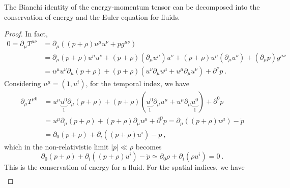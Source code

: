     The Bianchi identity of the energy-momentum tensor can be decomposed into the conservation of energy and the Euler equation for fluids.
    \begin{proof}
        In fact, 
        \begin{equation*}
        \begin{aligned}
            0 = \partial_\mu T^{\mu\nu} & = \partial_\mu ((p+\rho) u^\mu u^\nu + p g^{\mu\nu}) \\ & = \partial_\mu (p + \rho) u^\mu u^\nu + (p + \rho) (\partial_\mu u^\mu) u^\nu + (p + \rho) u^\mu (\partial_\mu u^\nu)  + (\partial_\mu p) g^{\mu\nu} \\ & = u^\mu u^\nu \partial_\mu (p + \rho) + (p + \rho) (u^\nu \partial_\mu u^\mu + u^\mu \partial_\mu u^\nu) + \partial^\nu p ~.
        \end{aligned}
        \end{equation*}
        Considering $u^\mu = (1, u^i)$, for the temporal index, we have 
        \begin{equation*}
        \begin{aligned}
            \partial_\mu T^{\mu 0} & = u^\mu \underbrace{u^0}_1 \partial_\mu (p + \rho) + (p + \rho) (\underbrace{u^0}_1 \partial_\mu u^\mu + u^\mu \partial_\mu \underbrace{u^0}_1) + \partial^0 p \\ & = u^\mu \partial_\mu (p + \rho) + (p + \rho) \partial_\mu u^\mu  + \partial^0 p = \partial_\mu ((p + \rho)u^\mu) - \dot p \\ & = \partial_0 (p + \rho) + \partial_i ((p + \rho) u^i) - \dot p ~,
        \end{aligned}
        \end{equation*}
        which in the non-relativistic limit $|p| \ll \rho$ becomes 
        \begin{equation*}
            \partial_0 (p + \rho) + \partial_i ((p + \rho) u^i) - \dot p \simeq \partial_0 \rho + \partial_i (\rho u^i) = 0 ~.
        \end{equation*}
        This is the conservation of energy for a fluid.
        For the spatial indices, we have 
        \begin{equation*}
        \begin{aligned}

\end{aligned}
\end{equation*}
\end{proof}
